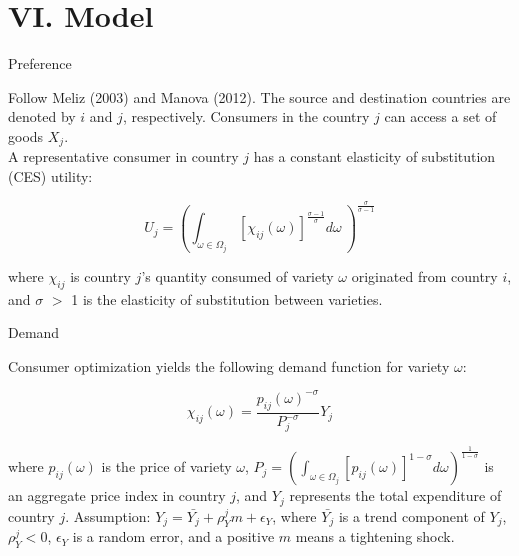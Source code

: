 \documentclass[10pt]{beamer}
\begin{document}
\section{VI. Model}

\begin{frame}{Preference}

Follow Meliz (2003) and Manova (2012). The source and destination countries are denoted by $i$ and $j$, respectively. Consumers in the country $j$ can access a set of goods $X_j$. \\
\medskip
A representative consumer in country $j$ has a constant elasticity of substitution (CES) utility:

\begin{equation}
U_j=(\int_{\omega \in \Omega_j} [\chi_{ij}(\omega)]^{\frac{\sigma-1}{\sigma}} d\omega\ )^\frac{\sigma}{\sigma-1}
\end{equation}

where $\chi_{ij}$ is country $j$’s quantity consumed of variety $\omega$ originated from country $i$, and $\sigma$ $>$ 1 is the elasticity of substitution between varieties. 

\end{frame}



\begin{frame}{Demand}

Consumer optimization yields the following demand function for variety $\omega$:

\begin{equation}
\chi_{ij}(\omega)=\frac{p_{ij}(\omega)^{-\sigma}}{P_j^{-\sigma}} Y_j
\end{equation}


where $p_{ij}(\omega)$ is the price of variety $\omega$, $P_j=(\int_{\omega \in \Omega_j} [p_{ij}(\omega)]^{1-\sigma} d \omega)^{\frac{1}{1-\sigma}}$ is an aggregate price index in country $j$, and $Y_j$ represents the total expenditure of country $j$.
\vfill
Assumption: $Y_j=\bar{Y_j}+\rho_{Y}^j m+\epsilon_Y$, where $\bar{Y_j}$ is a trend component of $Y_j$, $\rho_{Y}^j<0$, $\epsilon_Y$ is a random error, and a positive $m$ means a tightening shock.

\end{frame}
\end{document}
